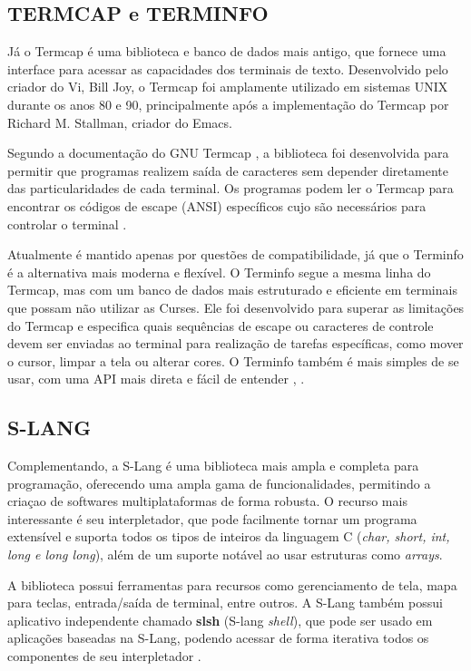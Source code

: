 \subsection{TERMCAP e TERMINFO}

Já o Termcap é uma biblioteca e banco de dados mais antigo, que fornece uma
interface para acessar as capacidades dos terminais de texto. Desenvolvido pelo criador
do Vi, Bill Joy, o Termcap foi amplamente utilizado em sistemas UNIX durante os anos
80 e 90, principalmente após a implementação do Termcap por Richard M. Stallman,
criador do Emacs.

Segundo a documentação do GNU Termcap \cite{stallman_termcap}, a biblioteca foi desenvolvida
para permitir que programas realizem saída de caracteres sem depender diretamente
das particularidades de cada terminal. Os programas podem ler o Termcap para
encontrar os códigos de escape (ANSI) específicos cujo são necessários para
controlar o terminal \cite{kerrisk_termcap_man7}.

Atualmente é mantido apenas por questões de compatibilidade, já que o Terminfo é
a alternativa mais moderna e flexível. O Terminfo segue a mesma linha do Termcap,
mas com um banco de dados mais estruturado e eficiente em terminais que possam
não utilizar as Curses. Ele foi desenvolvido para superar as limitações do Termcap
e especifica quais sequências de escape ou caracteres de controle devem ser enviadas
ao terminal para realização de tarefas específicas, como mover o cursor, limpar a
tela ou alterar cores. O Terminfo também é mais simples de se usar, com uma API mais
direta e fácil de entender \cite{man7_terminfo}, \cite{tldp_text_terminal_howto}.

\subsection{S-LANG}

Complementando, a S-Lang é uma biblioteca mais ampla e completa para
programação, oferecendo uma ampla gama de funcionalidades, permitindo a criaçao de
softwares multiplataformas de forma robusta. O recurso mais interessante
é seu interpletador, que pode facilmente tornar um programa extensível e suporta
todos os tipos de inteiros da linguagem C (\textit{char, short, int, long e long
long}), além de um suporte notável ao usar estruturas como \textit{arrays}.

A biblioteca possui ferramentas para recursos como gerenciamento de tela, mapa
para teclas, entrada/saída de terminal, entre outros. A S-Lang também possui aplicativo
independente chamado \textbf{slsh} (S-lang \textit{shell}), que pode ser usado
em aplicações baseadas na S-Lang, podendo acessar de forma iterativa todos os componentes
de seu interpletador \cite{Davis2022S_Lang}.
